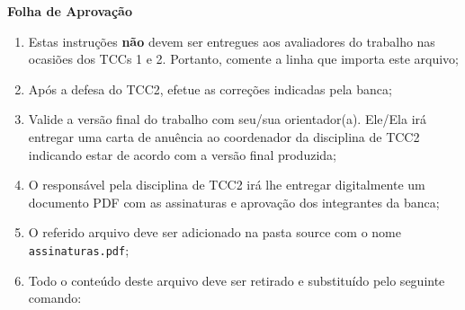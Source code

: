 \begin{center} \LARGE \bf Folha de Aprovação \end{center}


\begin{enumerate}
    \item Estas instruções \textbf{não} devem ser entregues aos avaliadores do trabalho nas ocasiões dos TCCs 1 e 2. Portanto, comente a linha que importa este arquivo;
    \item Após a defesa do TCC2, efetue as correções indicadas pela banca;
    \item Valide a versão final do trabalho com seu/sua orientador(a). Ele/Ela irá entregar uma carta de anuência ao coordenador da disciplina de TCC2 indicando estar de acordo com a versão final produzida;
    \item O responsável pela disciplina de TCC2 irá lhe entregar digitalmente um documento PDF com as assinaturas e aprovação dos integrantes da banca;
    \item O referido arquivo deve ser adicionado na pasta source com o nome \texttt{assinaturas.pdf};
    \item Todo o conteúdo deste arquivo deve ser retirado e substituído pelo seguinte comando:

   \begin{verbatim}
       
   \end{verbatim}
\end{enumerate}

\newpage
